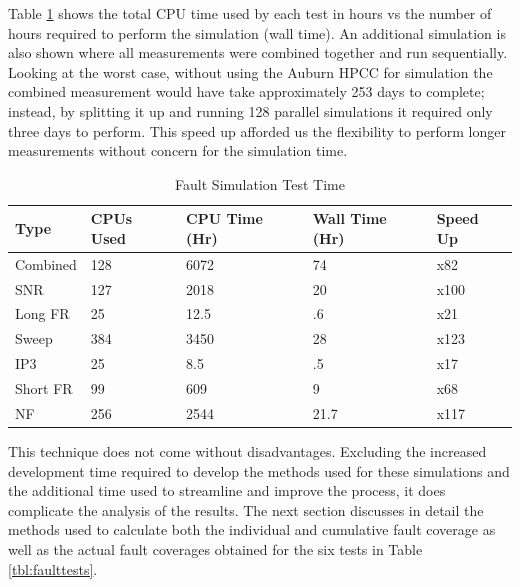 \documentclass[12pt]{report}
\begin{document}
Table \ref{tbl:faulttesttime} shows the total CPU time used by each test in hours vs the number of hours required to perform the simulation (wall time).  An additional simulation is also shown where all measurements were combined together and run sequentially.  Looking at the worst case, without using the Auburn HPCC for simulation the combined measurement would have take approximately 253 days to complete; instead, by splitting it up and running 128 parallel simulations it required only three days to perform.  This speed up afforded us the flexibility to perform longer measurements without concern for the simulation time.
\begin{table}
  \begin{center}
    \caption{Fault Simulation Test Time}
    \begin{tabular}{|l|l|l|l|l|}
      \hline
      Type & CPUs Used & CPU Time (Hr) & Wall Time (Hr) & Speed Up \\ \hline
      Combined & 128 & 6072 & 74 & x82 \\ \hline
      SNR & 127 & 2018 & 20 & x100 \\ \hline
      Long FR & 25 & 12.5 & .6 & x21 \\ \hline
      Sweep & 384 & 3450 & 28 & x123 \\ \hline
      IP3 & 25 & 8.5 & .5 & x17 \\ \hline
      Short FR & 99 & 609 & 9 & x68 \\ \hline
      NF & 256 & 2544 & 21.7 & x117 \\
      \hline
    \end{tabular}
  \label{tbl:faulttesttime}
  \end{center}
\end{table}

This technique does not come without disadvantages.  Excluding the increased development time required to develop the methods used for these simulations and the additional time used to streamline and improve the process, it does complicate the analysis of the results.  The next section discusses in detail the methods used to calculate both the individual and cumulative fault coverage as well as the actual fault coverages obtained for the six tests in Table \ref{tbl:faulttests}.
\end{document}
